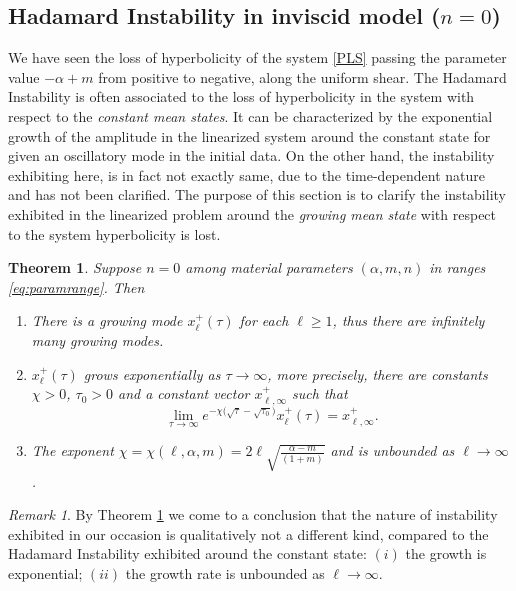 \documentclass[a4paper,11pt]{article}
\def\l{{\ell}}
\newtheorem{theorem}{Theorem}
\theoremstyle{remark}
\newtheorem{remark}{Remark}[section]
\begin{document}
{\subsection{Hadamard Instability in inviscid model ($n=0$)} \label{sec:Hadamard}
We have seen the loss of hyperbolicity of the system \eqref{PLS} passing the parameter value $-\alpha+m$ from positive to negative, along the uniform shear. The Hadamard Instability is often associated to the loss of hyperbolicity in the system with respect to the {\it constant mean states}. It can be characterized by the exponential growth of the amplitude in the linearized system around the constant state for given an oscillatory mode in the initial data. On the other hand, the instability exhibiting here, is in fact not exactly same, due to the time-dependent nature and has not been clarified. The purpose of this section is to clarify the instability exhibited in the linearized problem around the {\it growing mean state} with respect to the system hyperbolicity is lost.

\begin{theorem} \label{thm:Hadamard} Suppose $n=0$ among material parameters $(\alpha,m,n)$ in ranges \eqref{eq:paramrange}. Then
  \begin{enumerate}
    \item There is a growing mode $x_\ell^+(\tau)$ for each $\ell\ge1$, thus there are infinitely many growing modes.
    \item $x_\ell^+(\tau)$ grows exponentially as $\tau \rightarrow \infty$, more precisely, there are constants $\chi>0$, $\tau_0>0$ and a constant vector $x_{\ell,\infty}^+$ such that
    \begin{equation}
      \lim_{\tau \rightarrow \infty} e^{-\chi \big(\sqrt{\tau}-\sqrt{\tau_0}\big)} x_\ell^+(\tau) = x_{\ell,\infty}^+.
    \end{equation}
    \item The exponent $\chi=\chi(\ell,\alpha,m)=2\l\sqrt{\frac{\alpha-m}{(1+m)}}$ and is unbounded as $\ell \rightarrow \infty$.
  \end{enumerate}
\end{theorem}

\begin{remark} By Theorem \ref{thm:Hadamard} we come to a conclusion that the nature of instability exhibited in our occasion is qualitatively not a different kind, compared to the Hadamard Instability exhibited around the constant state: $(i)$ the growth is exponential; $(ii)$ the growth rate is unbounded as $\ell \rightarrow \infty$.
\end{remark}

}
\end{document}
